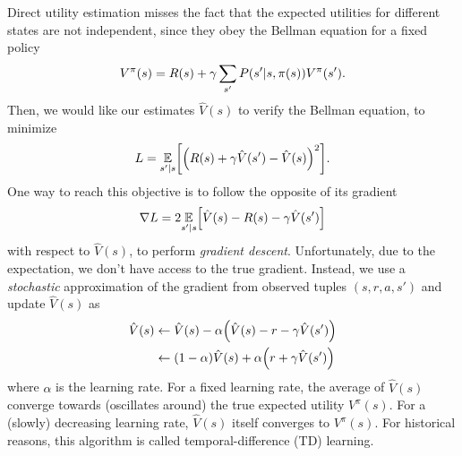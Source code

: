 \documentclass[11pt, a4paper]{article}
\begin{document}
\begin{enumerate}
    \begin{solution}
        Direct utility estimation misses the fact that the expected utilities for different states are not independent, since they obey the Bellman equation for a fixed policy
        \begin{equation*}
            V^\pi(s) = R(s) + \gamma \sum_{s'} P(s' \vert s, \pi(s)) V^\pi(s').
        \end{equation*}
        Then, we would like our estimates $\hat{V}(s)$ to verify the Bellman equation, \ie{} to minimize
        \begin{equation*}
            L = \underset{s' \knowing s}{\E} \sbk*{\rbk*{R(s) + \gamma \hat{V}(s') - \hat{V}(s)}^2} .
        \end{equation*}
        One way to reach this objective is to follow the opposite of its gradient
        \begin{equation*}
            \nabla L = 2 \underset{s' \knowing s}{\E} \sbk*{\hat{V}(s) - R(s) - \gamma \hat{V}(s')}
        \end{equation*}
        with respect to $\hat{V}(s)$, \ie{} to perform \emph{gradient descent}. Unfortunately, due to the expectation, we don't have access to the true gradient. Instead, we use a \emph{stochastic} approximation of the gradient from observed\footnotemark{} tuples $(s, r, a, s')$ and update $\hat{V}(s)$ as
        \begin{align*}
            \hat{V}(s) & \gets \hat{V}(s) - \alpha \rbk*{\hat{V}(s) - r - \gamma \hat{V}(s')} \\
            & \gets (1 - \alpha) \hat{V}(s) + \alpha \rbk*{r + \gamma \hat{V}(s')}
        \end{align*}
        where $\alpha$ is the learning rate. For a fixed learning rate, the average of $\hat{V}(s)$ converge towards (oscillates around) the true expected utility $V^\pi(s)$. For a (slowly) decreasing learning rate, $\hat{V}(s)$ itself converges to $V^\pi(s)$. For historical reasons, this algorithm is called temporal-difference (TD) learning.
        
        

\end{solution}
\end{enumerate}
\end{document}
